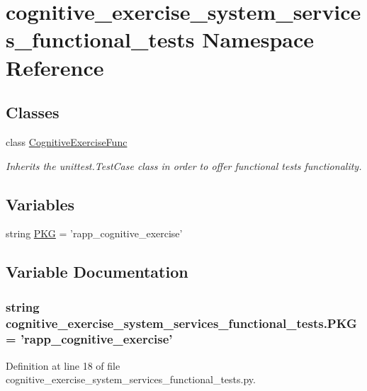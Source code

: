\hypertarget{namespacecognitive__exercise__system__services__functional__tests}{\section{cognitive\-\_\-exercise\-\_\-system\-\_\-services\-\_\-functional\-\_\-tests Namespace Reference}
\label{namespacecognitive__exercise__system__services__functional__tests}
}
\subsection*{Classes}
\begin{DoxyCompactItemize}
\item 
class \hyperlink{classcognitive__exercise__system__services__functional__tests_1_1CognitiveExerciseFunc}{Cognitive\-Exercise\-Func}
\begin{DoxyCompactList}\small\item\em Inherits the unittest.\-Test\-Case class in order to offer functional tests functionality. \end{DoxyCompactList}\end{DoxyCompactItemize}
\subsection*{Variables}
\begin{DoxyCompactItemize}
\item 
string \hyperlink{namespacecognitive__exercise__system__services__functional__tests_ad416e9f8bbead5cb6c83f4d5d1f4945e}{P\-K\-G} = 'rapp\-\_\-cognitive\-\_\-exercise'
\end{DoxyCompactItemize}


\subsection{Variable Documentation}
\hypertarget{namespacecognitive__exercise__system__services__functional__tests_ad416e9f8bbead5cb6c83f4d5d1f4945e}{
\subsubsection[{P\-K\-G}]{\setlength{\rightskip}{0pt plus 5cm}string cognitive\-\_\-exercise\-\_\-system\-\_\-services\-\_\-functional\-\_\-tests.\-P\-K\-G = 'rapp\-\_\-cognitive\-\_\-exercise'}}\label{namespacecognitive__exercise__system__services__functional__tests_ad416e9f8bbead5cb6c83f4d5d1f4945e}


Definition at line 18 of file cognitive\-\_\-exercise\-\_\-system\-\_\-services\-\_\-functional\-\_\-tests.\-py.

